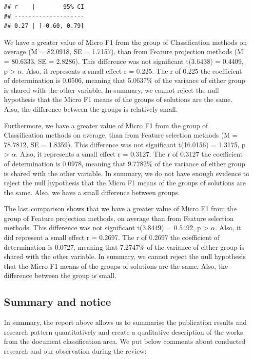 \documentclass[
]{article}
\begin{document}
\begin{verbatim}
## r    |        95% CI
## --------------------
## 0.27 | [-0.60, 0.79]
\end{verbatim}

We have a greater value of Micro F1 from the group of Classification methods on average (M = 82.0918, SE = 1.7157), than from Feature projection methods (M = 80.6333, SE = 2.8286). This difference was not significant t(3.6438) = 0.4409, p \textgreater{} \(\alpha\). Also, it represents a small effect r = 0.225. The r of 0.225 the coefficient of determination is 0.0506, meaning that 5.0637\% of the variance of either group is shared with the other variable. In summary, we cannot reject the null hypothesis that the Micro F1 means of the groups of solutions are the same. Also, the difference between the groups is relatively small.

Furthermore, we have a greater value of Micro F1 from the group of Classification methods on average, than from Feature selection methods (M = 78.7812, SE = 1.8359). This difference was not significant t(16.0156) = 1.3175, p \textgreater{} \(\alpha\). Also, it represents a small effect r = 0.3127. The r of 0.3127 the coefficient of determination is 0.0978, meaning that 9.7782\% of the variance of either group is shared with the other variable. In summary, we do not have enough evidence to reject the null hypothesis that the Micro F1 means of the groups of solutions are the same. Also, we have a small difference between groups.

The last comparison shows that we have a greater value of Micro F1 from the group of Feature projection methods, on average than from Feature selection methods. This difference was not significant t(3.8449) = 0.5492, p \textgreater{} \(\alpha\). Also, it did represent a small effect r = 0.2697. The r of 0.2697 the coefficient of determination is 0.0727, meaning that 7.2747\% of the variance of either group is shared with the other variable. In summary, we cannot reject the null hypothesis that the Micro F1 means of the groups of solutions are the same. Also, the difference between the group is small.

\hypertarget{summary-and-notice}{%
\subsection{Summary and notice}\label{summary-and-notice}}

In summary, the report above allows us to summarise the publication results and research pattern quantitatively and create a qualitative description of the works from the document classification area. We put below comments about conducted research and our observation during the review:
\end{document}
